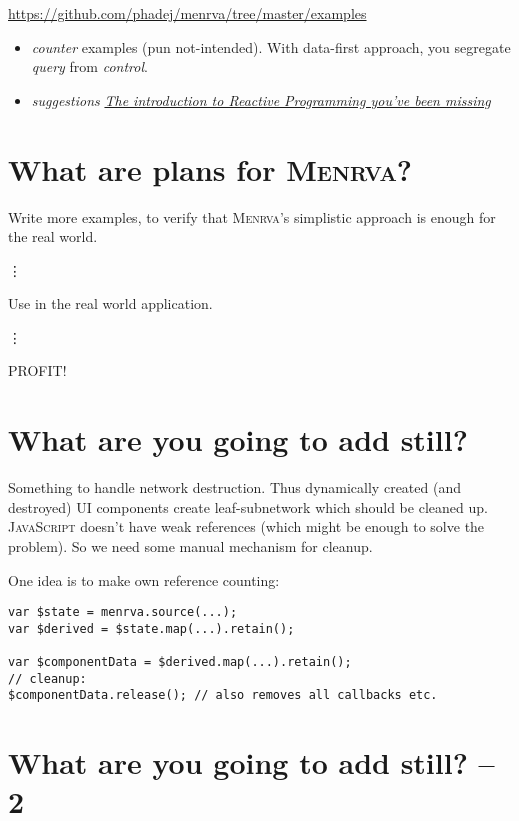 \documentclass[10pt,fleqn]{article}
\theoremstyle{definition}
\theoremstyle{plain}
\begin{document}
\url{https://github.com/phadej/menrva/tree/master/examples}

\begin{itemize}
\item \emph{counter} examples (pun not-intended). With data-first approach, you segregate \emph{query} from \emph{control}.
\item \emph{suggestions} \href{https://gist.github.com/staltz/868e7e9bc2a7b8c1f754}{\emph{The introduction to Reactive Programming you've been missing}}
\end{itemize}

\newpage


\section*{What are plans for \textsc{Menrva}?}

Write more examples, to verify that \textsc{Menrva}'s simplistic approach is enough for the real world.

\hspace{5mm}\vdots

Use in the real world application.

\hspace{5mm}\vdots

PROFIT!

\newpage

\section*{What are you going to add still?}

Something to handle network destruction.
Thus dynamically created (and destroyed) UI components create leaf-subnetwork which should be cleaned up.
\textsc{JavaScript} doesn't have weak references (which might be enough to solve the problem).
So we need some manual mechanism for cleanup.

One idea is to make own reference counting:
\begin{verbatim}
var $state = menrva.source(...);
var $derived = $state.map(...).retain();

var $componentData = $derived.map(...).retain();
// cleanup:
$componentData.release(); // also removes all callbacks etc.
\end{verbatim}
\newpage


\section*{What are you going to add still? -- 2}
\end{document}
